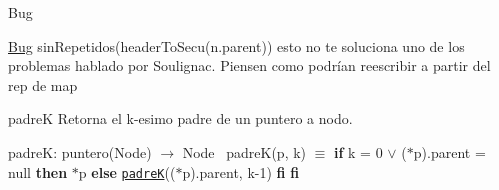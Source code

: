 \begin{DoxyRefDesc}{Bug}
\item[\hyperlink{bug__bug000002}{Bug}]sin\+Repetidos(header\+To\+Secu(n.\+parent)) esto no te soluciona uno de los problemas hablado por Soulignac. Piensen como podrían reescribir a partir del rep de map\end{DoxyRefDesc}


\begin{DoxyParagraph}{padreK}
Retorna el k-\/esimo padre de un puntero a nodo.

padreK\+: puntero(\+Node) $\to$ Node~\newline
 padre\+K(p, k) $\equiv$ {\bfseries if} k = 0 $\lor$ ($\ast$p).parent = null {\bfseries then} $\ast$p {\bfseries else} \href{axiomas.html#padreK}{\tt padreK}(($\ast$p).parent, k-\/1) {\bfseries fi} {\bfseries fi} 
\end{DoxyParagraph}
